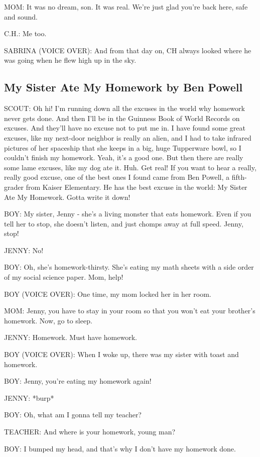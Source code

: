 MOM:
It was no dream, son.
It was real.
We're just glad you're back here, safe and sound.

C.H.:
Me too.

SABRINA (VOICE OVER):
And from that day on, CH always looked where he was going when he flew high up in the sky.

\subsection{My Sister Ate My Homework by Ben Powell}

SCOUT:
Oh hi!
I'm running down all the excuses in the world why homework never gets done.
And then I'll be in the Guinness Book of World Records on excuses.
And they'll have no excuse not to put me in.
I have found some great excuses, like my next-door neighbor is really an alien, and I had to take infrared pictures of her spaceship that she keeps in a big, huge Tupperware bowl, so I couldn't finish my homework.
Yeah, it's a good one.
But then there are really some lame excuses, like my dog ate it.
Huh.
Get real!
If you want to hear a really, really good excuse, one of the best ones I found came from Ben Powell, a fifth-grader from Kaiser Elementary.
He has the best excuse in the world: My Sister Ate My Homework.
Gotta write it down!

BOY:
My sister, Jenny - she's a living monster that eats homework.
Even if you tell her to stop, she doesn't listen, and just chomps away at full speed.
Jenny, stop!

JENNY:
No!

BOY:
Oh, she's homework-thirsty.
She's eating my math sheets with a side order of my social science paper.
Mom, help!

BOY (VOICE OVER):
One time, my mom locked her in her room.

MOM:
Jenny, you have to stay in your room so that you won't eat your brother's homework.
Now, go to sleep.

JENNY:
Homework.
Must have homework.

BOY (VOICE OVER):
When I woke up, there was my sister with toast and homework.

BOY:
Jenny, you're eating my homework again!

JENNY:
*burp*

BOY:
Oh, what am I gonna tell my teacher?

TEACHER:
And where is your homework, young man?

BOY:
I bumped my head, and that's why I don't have my homework done.

